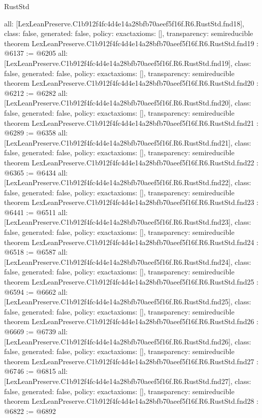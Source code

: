 \begin{lexlean}{RustStd}
\begin{coremodule}
{  all: [LexLeanPreserve.C1b912f4fc4d4e14a28bfb70aeef5f16f.R6.RustStd.fnd18],
  class: false,
  generated: false,
  policy: exact{axioms: []},
  transparency: semireducible
}
theorem LexLeanPreserve.C1b912f4fc4d4e14a28bfb70aeef5f16f.R6.RustStd.fnd19 : @6137 := @6205 {
  all: [LexLeanPreserve.C1b912f4fc4d4e14a28bfb70aeef5f16f.R6.RustStd.fnd19],
  class: false,
  generated: false,
  policy: exact{axioms: []},
  transparency: semireducible
}
theorem LexLeanPreserve.C1b912f4fc4d4e14a28bfb70aeef5f16f.R6.RustStd.fnd20 : @6212 := @6282 {
  all: [LexLeanPreserve.C1b912f4fc4d4e14a28bfb70aeef5f16f.R6.RustStd.fnd20],
  class: false,
  generated: false,
  policy: exact{axioms: []},
  transparency: semireducible
}
theorem LexLeanPreserve.C1b912f4fc4d4e14a28bfb70aeef5f16f.R6.RustStd.fnd21 : @6289 := @6358 {
  all: [LexLeanPreserve.C1b912f4fc4d4e14a28bfb70aeef5f16f.R6.RustStd.fnd21],
  class: false,
  generated: false,
  policy: exact{axioms: []},
  transparency: semireducible
}
theorem LexLeanPreserve.C1b912f4fc4d4e14a28bfb70aeef5f16f.R6.RustStd.fnd22 : @6365 := @6434 {
  all: [LexLeanPreserve.C1b912f4fc4d4e14a28bfb70aeef5f16f.R6.RustStd.fnd22],
  class: false,
  generated: false,
  policy: exact{axioms: []},
  transparency: semireducible
}
theorem LexLeanPreserve.C1b912f4fc4d4e14a28bfb70aeef5f16f.R6.RustStd.fnd23 : @6441 := @6511 {
  all: [LexLeanPreserve.C1b912f4fc4d4e14a28bfb70aeef5f16f.R6.RustStd.fnd23],
  class: false,
  generated: false,
  policy: exact{axioms: []},
  transparency: semireducible
}
theorem LexLeanPreserve.C1b912f4fc4d4e14a28bfb70aeef5f16f.R6.RustStd.fnd24 : @6518 := @6587 {
  all: [LexLeanPreserve.C1b912f4fc4d4e14a28bfb70aeef5f16f.R6.RustStd.fnd24],
  class: false,
  generated: false,
  policy: exact{axioms: []},
  transparency: semireducible
}
theorem LexLeanPreserve.C1b912f4fc4d4e14a28bfb70aeef5f16f.R6.RustStd.fnd25 : @6594 := @6662 {
  all: [LexLeanPreserve.C1b912f4fc4d4e14a28bfb70aeef5f16f.R6.RustStd.fnd25],
  class: false,
  generated: false,
  policy: exact{axioms: []},
  transparency: semireducible
}
theorem LexLeanPreserve.C1b912f4fc4d4e14a28bfb70aeef5f16f.R6.RustStd.fnd26 : @6669 := @6739 {
  all: [LexLeanPreserve.C1b912f4fc4d4e14a28bfb70aeef5f16f.R6.RustStd.fnd26],
  class: false,
  generated: false,
  policy: exact{axioms: []},
  transparency: semireducible
}
theorem LexLeanPreserve.C1b912f4fc4d4e14a28bfb70aeef5f16f.R6.RustStd.fnd27 : @6746 := @6815 {
  all: [LexLeanPreserve.C1b912f4fc4d4e14a28bfb70aeef5f16f.R6.RustStd.fnd27],
  class: false,
  generated: false,
  policy: exact{axioms: []},
  transparency: semireducible
}
theorem LexLeanPreserve.C1b912f4fc4d4e14a28bfb70aeef5f16f.R6.RustStd.fnd28 : @6822 := @6892 {
}
\end{coremodule}
\end{lexlean}
